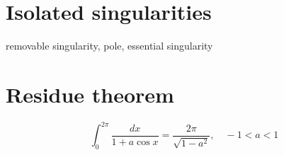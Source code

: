 \documentclass{../../large}
\begin{document}
\section{Isolated singularities}
\begin{prb}
removable singularity, pole, essential singularity
\end{prb}
\begin{prb}
\end{prb}
\begin{prb}
\end{prb}
\begin{prb}
\end{prb}


\section{Residue theorem}
\begin{prb}

\end{prb}


\begin{prb}
\[\int_0^{2\pi}\frac{dx}{1+a\cos x}=\frac{2\pi}{\sqrt{1-a^2}},\quad-1<a<1\]
\end{prb}
\end{document}

